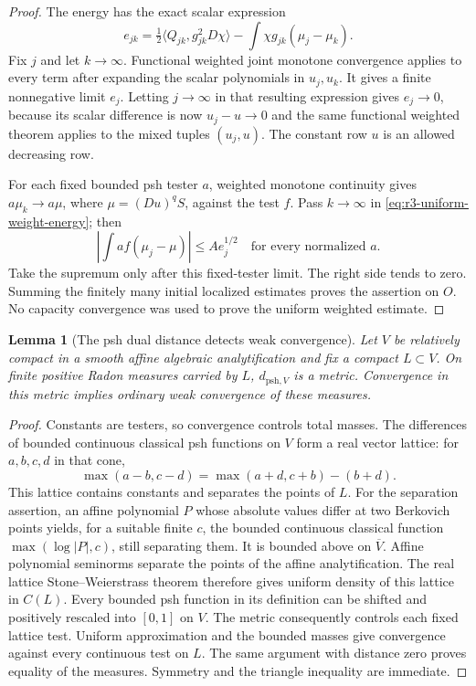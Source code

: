 \documentclass[11pt,a4paper]{article}
\numberwithin{equation}{section}
\newtheorem{lemma}[theorem]{Lemma}
\theoremstyle{definition}
\theoremstyle{remark}
\begin{document}
\begin{proof}
The energy has the exact scalar expression
\begin{equation}
 e_{jk}
   =\tfrac12\langle Q_{jk},g_{jk}^2D\chi\rangle
       -\int\chi g_{jk}(\mu_j-\mu_k).
 \label{eq:r3-dual-energy-expansion}
\end{equation}
Fix $j$ and let $k\to\infty$.  Functional weighted joint monotone
convergence applies to every term after expanding the scalar
polynomials in $u_j,u_k$.  It gives a finite nonnegative limit
$e_j$.  Letting $j\to\infty$ in that resulting expression gives
$e_j\to0$, because its scalar difference is now $u_j-u\to0$ and
the same functional weighted theorem applies to the mixed tuples
$(u_j,u)$.  The constant row $u$ is an allowed decreasing row.

For each fixed bounded psh tester $a$, weighted monotone continuity
gives $a\mu_k\to a\mu$, where $\mu=(Du)^qS$, against the test $f$.
Pass $k\to\infty$ in \eqref{eq:r3-uniform-weight-energy}; then
\[
 \left|\int af(\mu_j-\mu)\right|\leq A e_j^{1/2}
 \quad\text{for every normalized }a.
\]
Take the supremum only after this fixed-tester limit.  The right
side tends to zero.  Summing the finitely many initial localized
estimates proves the assertion on $O$.  No capacity convergence
was used to prove the uniform weighted estimate.
\end{proof}

\begin{lemma}[The psh dual distance detects weak convergence]
\label{lem:r3-dual-determines-weak}
Let $V$ be relatively compact in a smooth affine algebraic analytification
and fix a compact $L\subset V$.  On finite positive Radon measures
carried by $L$, $d_{\mathrm{psh},V}$ is a metric.  Convergence in this
metric implies ordinary weak convergence of these measures.
\end{lemma}

\begin{proof}
Constants are testers, so convergence controls total masses.  The
differences of bounded continuous classical psh functions on $V$
form a real vector lattice: for $a,b,c,d$ in that cone,
\[
 \max(a-b,c-d)=\max(a+d,c+b)-(b+d).
\]
This lattice contains constants and separates the points of $L$.
For the separation assertion, an affine polynomial $P$ whose
absolute values differ at two Berkovich points yields, for a suitable
finite $c$, the bounded continuous classical function
$\max(\log|P|,c)$, still separating them.  It is bounded above on
$\overline V$.  Affine polynomial seminorms separate the points of
the affine analytification.  The real lattice Stone--Weierstrass
theorem therefore gives uniform density of this lattice in $C(L)$.
Every bounded psh function in its definition can be shifted and
positively rescaled into $[0,1]$ on $V$.  The metric consequently
controls each fixed lattice test.  Uniform approximation and the
bounded masses give convergence against every continuous test on
$L$.  The same argument with distance zero proves equality of the
measures.  Symmetry and the triangle inequality are immediate.
\end{proof}
\end{document}
